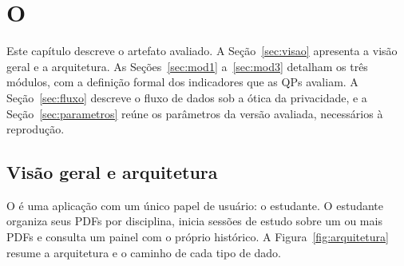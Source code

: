\chapter{\label{chap:ferramenta}O \ferramenta}

Este capítulo descreve o artefato avaliado. A Seção~\ref{sec:visao} apresenta a visão geral e a arquitetura. As Seções~\ref{sec:mod1} a~\ref{sec:mod3} detalham os três módulos, com a definição formal dos indicadores que as QPs avaliam. A Seção~\ref{sec:fluxo} descreve o fluxo de dados sob a ótica da privacidade, e a Seção~\ref{sec:parametros} reúne os parâmetros da versão avaliada, necessários à reprodução.

\section{\label{sec:visao}Visão geral e arquitetura}

O \ferramenta é uma aplicação  com um único papel de usuário: o estudante. O estudante organiza seus PDFs por disciplina, inicia sessões de estudo sobre um ou mais PDFs e consulta um painel com o próprio histórico. A Figura~\ref{fig:arquitetura} resume a arquitetura e o caminho de cada tipo de dado.

